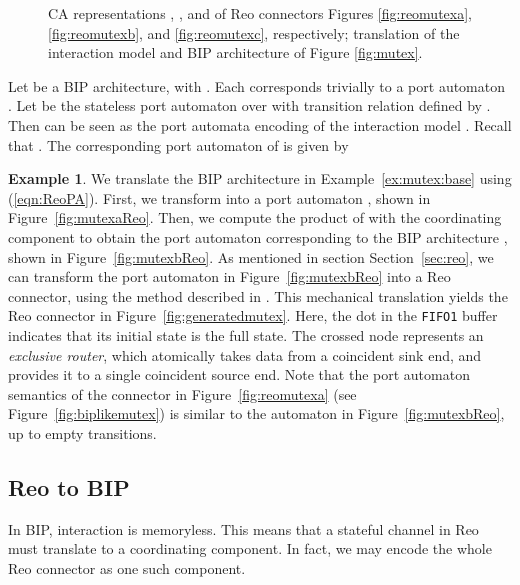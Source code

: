 \documentclass[submission,copyright,creativecommons,hidelinks]{eptcs}
\theoremstyle{plain} \newtheorem{theorem}{Theorem}
\theoremstyle{definition}
\newtheorem{example}{Example}
\theoremstyle{remark}
\newcommand\xqed[1]{\leavevmode\unskip\penalty9999 \hbox{}\nobreak\hfill
  \quad\hbox{#1}}
\newcommand\tri{\xqed{}}
\newcommand{\fig}[2][]{Figure~\ref{fig:#2}\ensuremath{#1}}
\newcommand{\eq}[1]{(\ref{eqn:#1})}
\newcommand{\ex}[1]{Example~\ref{ex:#1}}
\newcommand{\secn}[1]{Section~\ref{sec:#1}}
\begin{document}
\begin{figure}[t]
{{}}
\caption{CA representations , , and  of Reo connectors Figures \ref{fig:reomutexa}, \ref{fig:reomutexb}, and \ref{fig:reomutexc}, respectively; translation of the interaction model  and BIP architecture  of Figure \ref{fig:mutex}.}
\label{fig:mutexReo}
\end{figure}

Let  be a BIP architecture, with . Each  corresponds trivially to a port automaton . Let  be the stateless port automaton over  with transition relation  defined by . Then  can be seen as the port automata encoding of the interaction model . Recall that . The corresponding port automaton of  is given by 


\begin{example}
\label{ex:mutextranslation}
We translate the BIP architecture in \ex{mutex:base} using \eq{ReoPA}. 
First, we transform  into a port automaton , shown in \fig{mutexaReo}. Then, we compute the product of  with the coordinating component  to obtain the port automaton corresponding to the BIP architecture , shown in \fig{mutexbReo}.
As mentioned in section \secn{reo}, we can transform the port automaton in \fig{mutexbReo} into a Reo connector, using the method described in \cite{BKK14}.
This mechanical translation yields the Reo connector in \fig{generatedmutex}. 
Here, the dot in the {\tt FIFO1} buffer indicates that its initial state is the full state.
The crossed node represents an {\em exclusive router}, which atomically takes data from a coincident sink end, and provides it to a single coincident source end.
Note that the port automaton semantics of the connector in \fig{reomutexa} (see \fig{biplikemutex}) is similar to the automaton in \fig{mutexbReo}, up to empty transitions.
\tri\end{example}


\subsection{Reo to BIP}

In BIP, interaction is memoryless. This means that a stateful channel in Reo must translate to a coordinating component. In fact, we may encode the whole Reo connector as one such component. 
\end{document}
